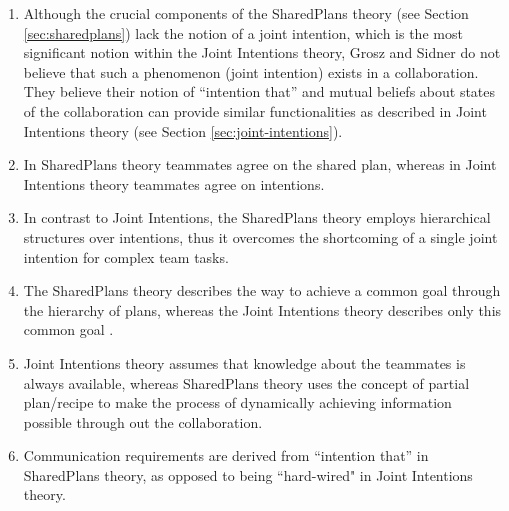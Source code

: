 \documentclass[12pt]{report}
\begin{document}
\begin{enumerate}
  \item Although the crucial components of the SharedPlans theory (see Section
  \ref{sec:sharedplans}) lack the notion of a joint intention, which is the most
  significant notion within the Joint Intentions theory, Grosz and Sidner do not
  believe that such a phenomenon (joint intention) exists in a collaboration.
  They believe their notion of ``intention that'' and mutual beliefs about
  states of the collaboration can provide similar functionalities as described
  in Joint Intentions theory (see Section \ref{sec:joint-intentions}).
  
  \item In SharedPlans theory teammates agree on the shared plan, whereas in
  Joint Intentions theory teammates agree on intentions.
  
  \item In contrast to Joint Intentions, the SharedPlans theory employs
  hierarchical structures over intentions, thus it overcomes the shortcoming of
  a single joint intention for complex team tasks.
  
  \item The SharedPlans theory describes the way to achieve a common goal
  through the hierarchy of plans, whereas the Joint Intentions theory describes
  only this common goal \cite{skubch:modelling-behavior-robots}.
  
  \item Joint Intentions theory assumes that knowledge about the teammates is
  always available, whereas SharedPlans theory uses the concept of partial
  plan/recipe to make the process of dynamically achieving information possible
  through out the collaboration.
  
  \item Communication requirements are derived from ``intention that'' in
  SharedPlans theory, as opposed to being ``hard-wired" in Joint Intentions
  theory.
\end{enumerate}
\end{document}
